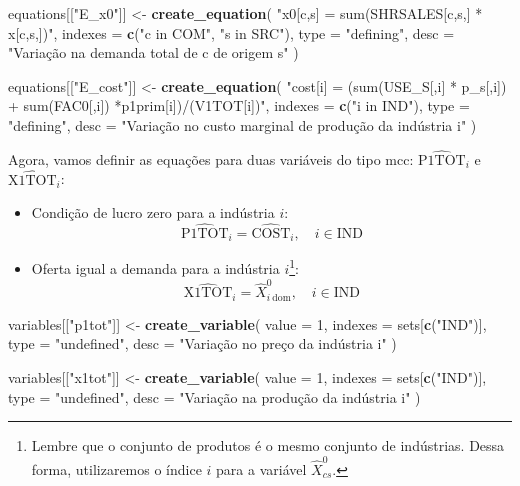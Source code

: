 \documentclass[12pt,twoside]{article}
\newenvironment{Shaded}{\begin{snugshade}}{\end{snugshade}}
\newcommand{\DataTypeTok}[1]{\textcolor[rgb]{0.13,0.29,0.53}{#1}}
\newcommand{\DecValTok}[1]{\textcolor[rgb]{0.00,0.00,0.81}{#1}}
\newcommand{\KeywordTok}[1]{\textcolor[rgb]{0.13,0.29,0.53}{\textbf{#1}}}
\newcommand{\NormalTok}[1]{#1}
\newcommand{\StringTok}[1]{\textcolor[rgb]{0.31,0.60,0.02}{#1}}
\let\oldShaded\Shaded
\let\endoldShaded\endShaded
\renewenvironment{Shaded}{\footnotesize\oldShaded}{\endoldShaded}
\let\rmarkdownfootnote\footnote%
\def\footnote{\protect\rmarkdownfootnote}
\begin{document}
\begin{Shaded}
\begin{Highlighting}[]
\NormalTok{equations[[}\StringTok{"E_x0"}\NormalTok{]] <-}\StringTok{ }\KeywordTok{create_equation}\NormalTok{(}
  \StringTok{"x0[c,s] = sum(SHRSALES[c,s,] * x[c,s,])"}\NormalTok{,}
  \DataTypeTok{indexes =} \KeywordTok{c}\NormalTok{(}\StringTok{"c in COM"}\NormalTok{, }\StringTok{"s in SRC"}\NormalTok{),}
  \DataTypeTok{type =} \StringTok{"defining"}\NormalTok{,}
  \DataTypeTok{desc =} \StringTok{"Variação na demanda total de c de origem s"}
\NormalTok{)}

\NormalTok{equations[[}\StringTok{"E_cost"}\NormalTok{]] <-}\StringTok{ }\KeywordTok{create_equation}\NormalTok{(}
  \StringTok{"cost[i] = (sum(USE_S[,i] * p_s[,i]) +}
\StringTok{                  sum(FAC0[,i]) *p1prim[i])/(V1TOT[i])"}\NormalTok{,}
  \DataTypeTok{indexes =} \KeywordTok{c}\NormalTok{(}\StringTok{"i in IND"}\NormalTok{),}
  \DataTypeTok{type =} \StringTok{"defining"}\NormalTok{,}
  \DataTypeTok{desc =} \StringTok{"Variação no custo marginal de produção da indústria i"}
\NormalTok{)}
\end{Highlighting}
\end{Shaded}

Agora, vamos definir as equações para duas variáveis do tipo mcc:
\(\hat{\text{P1TOT}}_i\) e \(\hat{\text{X1TOT}}_i\):

\begin{itemize}
\item
  Condição de lucro zero para a indústria \(i\):
  \[\hat{\text{P1TOT}}_i = \hat{\text{COST}}_i, \quad i \in \text{IND}\]
\item
  Oferta igual a demanda para a indústria \(i\)\footnote{Lembre que o
    conjunto de produtos é o mesmo conjunto de indústrias. Dessa forma,
    utilizaremos o índice \(i\) para a variável \(\hat{X}^0_{cs}\).}:
  \[\hat{\text{X1TOT}}_i = \hat{X}^0_{i~\text{dom}}, \quad i \in \text{IND}\]
\end{itemize}

\begin{Shaded}
\begin{Highlighting}[]
\NormalTok{variables[[}\StringTok{"p1tot"}\NormalTok{]] <-}\StringTok{ }\KeywordTok{create_variable}\NormalTok{(}
  \DataTypeTok{value =} \DecValTok{1}\NormalTok{,}
  \DataTypeTok{indexes =}\NormalTok{ sets[}\KeywordTok{c}\NormalTok{(}\StringTok{"IND"}\NormalTok{)],}
  \DataTypeTok{type =} \StringTok{"undefined"}\NormalTok{,}
  \DataTypeTok{desc =} \StringTok{"Variação no preço da indústria i"}
\NormalTok{)}

\NormalTok{variables[[}\StringTok{"x1tot"}\NormalTok{]] <-}\StringTok{ }\KeywordTok{create_variable}\NormalTok{(}
  \DataTypeTok{value =} \DecValTok{1}\NormalTok{,}
  \DataTypeTok{indexes =}\NormalTok{ sets[}\KeywordTok{c}\NormalTok{(}\StringTok{"IND"}\NormalTok{)],}
  \DataTypeTok{type =} \StringTok{"undefined"}\NormalTok{,}
  \DataTypeTok{desc =} \StringTok{"Variação na produção da indústria i"}
\NormalTok{)}
\end{Highlighting}
\end{Shaded}
\end{document}
